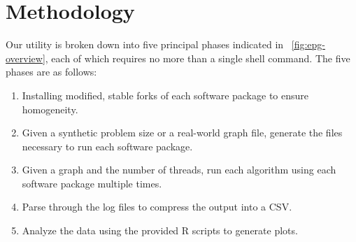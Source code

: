 \documentclass[conference]{IEEEtran}
\begin{document}



\section{Methodology}
Our utility is broken down into five principal phases indicated in \figurename~\ref{fig:epg-overview}, each of which requires no more than a single shell command. The five phases are as follows:
\begin{enumerate}
	\item Installing modified, stable forks of each software package to ensure homogeneity.
	\item Given a synthetic problem size or a real-world graph file, generate the files necessary to run each software package.
	\item Given a graph and the number of threads, run each algorithm using each software package multiple times.
	\item Parse through the log files to compress the output into a CSV.
	\item Analyze the data using the provided R scripts to generate plots.
\end{enumerate}
\end{document}
